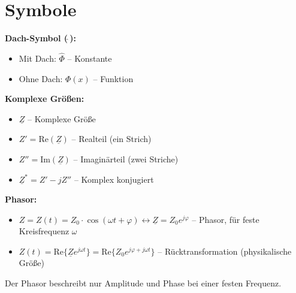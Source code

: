 \section{Symbole}

\textbf{Dach-Symbol ($\hat{\ }$):}
\begin{itemize}
\item Mit Dach: $\hat{\Phi}$ -- Konstante
\item Ohne Dach: $\Phi(x)$ -- Funktion
\end{itemize}


\textbf{Komplexe Größen:}
\begin{itemize}
\item $\underline{Z}$ -- Komplexe Größe
\item $Z' = \text{Re}(\underline{Z})$ -- Realteil (ein Strich)
\item $Z'' = \text{Im}(\underline{Z})$ -- Imaginärteil (zwei Striche)
\item $\underline{Z}^* = Z' - jZ''$ -- Komplex konjugiert
\end{itemize}



\textbf{Phasor:}
\begin{itemize}
\item $Z = Z(t) = Z_0 \cdot \cos(\omega t + \varphi) \leftrightarrow \underline{Z} = Z_0 e^{j\varphi}$ -- Phasor, für feste Kreisfrequenz $\omega$
\item $Z(t) = \text{Re}\{\underline{Z} e^{j\omega t}\} = \text{Re}\{Z_0 e^{j\varphi + j\omega t}\}$ -- Rücktransformation (physikalische Größe)
\end{itemize}
Der Phasor beschreibt nur Amplitude und Phase bei einer festen Frequenz.


